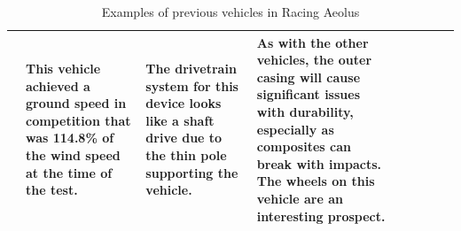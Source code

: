 \begin{table}[p]
\begin{tabular}{|m{5cm}|m{\x}|m{\x}|m{\x}|m{\x}|m{\x}|m{\x}|m{\x}|m{\x}|}
      &  
      This vehicle achieved a ground speed in competition that was 114.8\% of the wind speed at the time of the test.
      &  
      The drivetrain system for this device looks like a shaft drive due to the thin pole supporting the vehicle. 
      & 
      As with the other vehicles, the outer casing will cause significant issues with durability, especially as composites can break with impacts. The wheels on this vehicle are an interesting prospect. 
      \\ \hline
      
    \end{tabular}
    \caption{Examples of previous vehicles in Racing Aeolus}
    \label{tab:prevAttempts}
\end{table}
\twocolumn